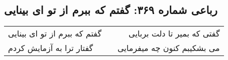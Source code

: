 \begin{center}
\section*{رباعی شماره ۳۶۹: گفتم که ببرم از تو ای بینایی}
\label{sec:sh369}
\begin{longtable}{l p{0.5cm} r}
گفتم که ببرم از تو ای بینایی
&&
گفتی که بمیر تا دلت بربایی
\\
گفتار ترا به آزمایش کردم
&&
می بشکیبم کنون چه میفرمایی
\\
\end{longtable}
\end{center}
